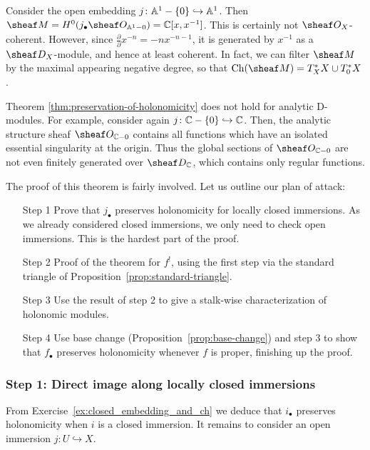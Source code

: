 \documentclass[number-in-sections,a4paper]{notes}
\begin{document}
\begin{Example}
    Consider the open embedding $j\colon \mathbb A^{1}_{} - \{0\} \hookrightarrow \mathbb A^{1}_{}$.
    Then $\sheaf M = H^0(j_\bullet \sO_{\as 1 \setminus 0}) = \CC[x, x^{-1}]$.
    This is certainly not $\sO_X$-coherent.
    However, since $\frac{\partial}{\partial} x^{-n} = -nx^{-n-1}$, it is generated by $x^{-1}$ as a $\sD_X$-module, and hence at least coherent.
    In fact, we can filter $\sheaf M$ by the maximal appearing negative degree, so that $\Ch(\sheaf M) = T^*_XX \cup T^*_0X$.
\end{Example}

\begin{Remark}
    Theorem \ref{thm:preservation-of-holonomicity} does not hold for analytic D-modules.
    For example, consider again $j\colon {\mathbb{C}} - \{0\} \hookrightarrow {\mathbb{C}}$.
    Then, the analytic structure sheaf $\sO_{\CC \setminus 0}$ contains all functions which have an isolated essential singularity at the origin.
    Thus the global sections of $\sO_{\CC \setminus 0}$ are not even finitely generated over $\sD_{\CC}$, which contains only regular functions.
\end{Remark}


The proof of this theorem is fairly involved.
Let us outline our plan of attack:
\begin{enumerate}
    \item[Step 1] Prove that $j_\bullet$ preserves holonomicity for locally closed immersions.
        As we already considered closed immersions, we only need to check open immersions.
        This is the hardest part of the proof.
    \item[Step 2] Proof of the theorem for $f^!$, using the first step via the standard triangle of Proposition~\ref{prop:standard-triangle}.
    \item[Step 3] Use the result of step 2 to give a stalk-wise characterization of holonomic modules.
    \item[Step 4] Use base change (Proposition~\ref{prop:base-change}) and step 3 to show that $f_\bullet$ preserves holonomicity whenever $f$ is proper, finishing up the proof.
\end{enumerate}

\subsubsection*{Step 1: Direct image along locally closed immersions}

From Exercise~\ref{ex:closed_embedding_and_ch} we deduce that $i_\bullet$ preserves holonomicity when $i$ is a closed immersion.
It remains to consider an open immersion $j\colon U \hookrightarrow X$.
\end{document}
